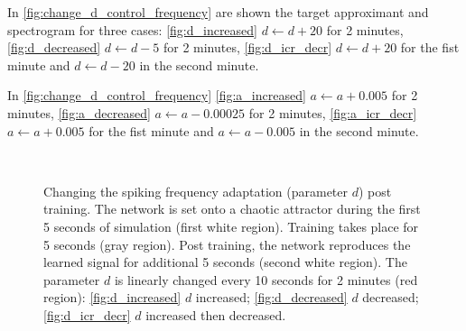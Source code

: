 \documentclass[10pt,a4paper, final]{report} %
\begin{document}
In \autoref{fig:change_d_control_frequency} are shown the target approximant and spectrogram for three cases: 
\autoref{fig:d_increased} $d \leftarrow d + 20$ for 2 minutes,
\autoref{fig:d_decreased} $d \leftarrow d - 5$ for 2 minutes,
\autoref{fig:d_icr_decr}  $d \leftarrow d + 20$ for the fist minute and $d \leftarrow d - 20$ in the second minute.

In \autoref{fig:change_d_control_frequency}
\autoref{fig:a_increased} $a \leftarrow a + 0.005$ for 2 minutes,
\autoref{fig:a_decreased} $a \leftarrow a - 0.00025$ for 2 minutes,
\autoref{fig:a_icr_decr}  $a \leftarrow a + 0.005$ for the fist minute and $a \leftarrow a - 0.005$ in the second minute.

\begin{figure}[H]
\centering
{}
\\


\caption{Changing the spiking frequency adaptation (parameter $d$) post training. The network is set onto a chaotic attractor during the first 5 seconds of simulation (first white region). Training takes place for 5 seconds (gray region). Post training, the network reproduces the learned signal for additional 5 seconds (second white region). The parameter $d$ is linearly changed every 10 seconds for 2 minutes (red region): \autoref{fig:d_increased} $d$ increased; \autoref{fig:d_decreased} $d$ decreased; \autoref{fig:d_icr_decr} $d$ increased then decreased.}
\label{fig:change_d_control_frequency}
\end{figure}
\end{document}
